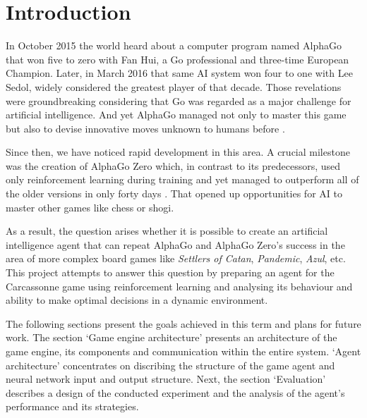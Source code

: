 \section{Introduction}
\label{chap:introduction}

In October 2015 the world heard about a computer program named AlphaGo that
won five to zero with Fan Hui, a Go professional and three-time European Champion. Later,
in March 2016 that same AI system won four to one with Lee Sedol, widely considered the
greatest player of that decade. Those revelations were groundbreaking considering that Go
was regarded as a major challenge for artificial intelligence. And yet AlphaGo managed not
only to master this game but also to devise innovative moves unknown to humans before \cite{AlphaGo}.

Since then, we have noticed rapid development in this area. A crucial milestone was
the creation of AlphaGo Zero which, in contrast to its predecessors, used only reinforcement
learning during training and yet managed to outperform all of the older versions in only forty
days \cite{AlphaGoZero}. That opened up opportunities for AI to master other games like chess 
or shogi.

As a result, the question arises whether it is possible to create an artificial intelligence
agent that can repeat AlphaGo and AlphaGo Zero's success in the area of more complex
board games like \textit{Settlers of Catan}, \textit{Pandemic}, \textit{Azul}, etc. This 
project attempts to answer this question by preparing an agent for the Carcassonne game 
using reinforcement learning and analysing its behaviour and ability to make optimal 
decisions in a dynamic environment.

The following sections present the goals achieved in this term and plans for future
work. The section `Game engine architecture' presents an architecture of the
game engine, its components and communication within the entire system. `Agent architecture' 
concentrates on discribing the structure of the game agent and neural network input and
output structure. Next, the section `Evaluation' describes a design of the conducted experiment 
and the analysis of the agent's performance and its strategies.
